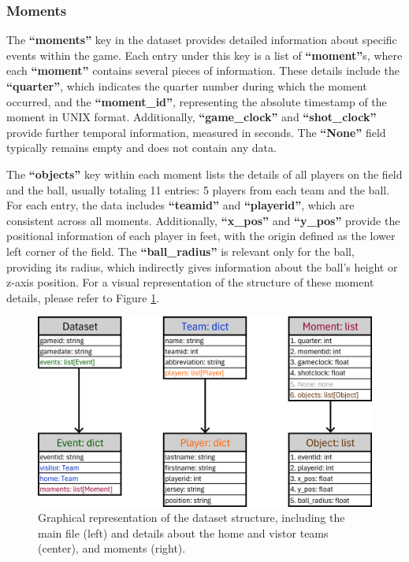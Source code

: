 \subsubsection{Moments}
\label{sect:moments}

The \textbf{``moments''} key in the dataset provides detailed information about specific events within the game. Each entry under this key is a list of \textbf{``moment''}s, where each \textbf{``moment''} contains several pieces of information. These details include the \textbf{``quarter''}, which indicates the quarter number during which the moment occurred, and the \textbf{``moment\_id''}, representing the absolute timestamp of the moment in UNIX format. Additionally, \textbf{``game\_clock''} and \textbf{``shot\_clock''} provide further temporal information, measured in seconds. The \textbf{``None''} field typically remains empty and does not contain any data.

The \textbf{``objects''} key within each moment lists the details of all players on the field and the ball, usually totaling 11 entries: 5 players from each team and the ball. For each entry, the data includes \textbf{``teamid''} and \textbf{``playerid''}, which are consistent across all moments. Additionally, \textbf{``x\_pos''} and \textbf{``y\_pos''} provide the positional information of each player in feet, with the origin defined as the lower left corner of the field. The \textbf{``ball\_radius''} is relevant only for the ball, providing its radius, which indirectly gives information about the ball's height or z-axis position. For a visual representation of the structure of these moment details, please refer to Figure \ref{fig:data-structure}.

\begin{figure}[t]
\centering
\includegraphics[width=\textwidth]{contents/data-structure.png}
\caption{Graphical representation of the dataset structure, including the main file (left) and details about the home and vistor teams (center), and moments (right).}
\label{fig:data-structure}
\end{figure}


